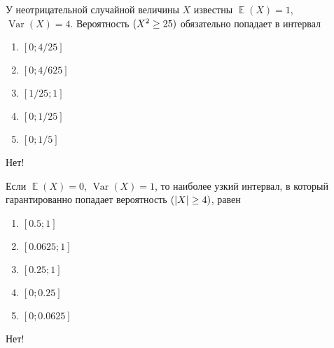 \documentclass[t]{beamer}
\DeclareMathOperator{\Var}{Var}
\DeclareMathOperator{\E}{\mathbb{E}}
\let\P\relax
\DeclareMathOperator{\P}{\mathbb{P}}
\begin{document}
 \begin{frame} \label{27-No} 
\begin{block}{27} 

У неотрицательной случайной величины $X$ известны $\E(X)=1$, $\Var(X)=4$. Вероятность $\P(X^2 \geq 25)$ обязательно попадает в интервал
 


 \end{block} 
\begin{enumerate} 
\item[] \hyperlink{27-No}{\beamergotobutton{} $[0;4/25]$}
\item[] \hyperlink{27-No}{\beamergotobutton{} $[0;4/625]$}
\item[] \hyperlink{27-No}{\beamergotobutton{} $[1/25;1]$}
\item[] \hyperlink{27-No}{\beamergotobutton{} $[0;1/25]$}
\item[] \hyperlink{27-Yes}{\beamergotobutton{} $[0;1/5]$}
\end{enumerate} 

 \alert{Нет!} 
\end{frame} 


 \begin{frame} \label{28-No} 
\begin{block}{28} 

Если $\E(X)=0$, $\Var(X)=1$, то наиболее узкий интервал, в который гарантированно попадает вероятность $\P(|X| \geq 4)$, равен


 \end{block} 
\begin{enumerate} 
\item[] \hyperlink{28-No}{\beamergotobutton{} $[0.5; 1]$
}
\item[] \hyperlink{28-No}{\beamergotobutton{} $[0.0625; 1]$}
\item[] \hyperlink{28-No}{\beamergotobutton{} $[0.25; 1]$}
\item[] \hyperlink{28-No}{\beamergotobutton{} $[0; 0.25]$}
\item[] \hyperlink{28-Yes}{\beamergotobutton{} $[0; 0.0625]$ }
\end{enumerate} 

 \alert{Нет!} 
\end{frame} 
\end{document}
